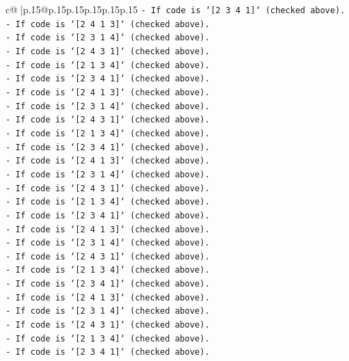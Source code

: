 \documentclass{article}
\begin{document}
{\begin{supertabular}{c@{$\;$}|p{.15\linewidth}@{}p{.15\linewidth}p{.15\linewidth}p{.15\linewidth}p{.15\linewidth}p{.15\linewidth}}
{{{\texttt{{-} If code is `{[}2 3 4 1{]}` (checked above).} \\
\texttt{{-} If code is `{[}2 4 1 3{]}` (checked above).} \\
\texttt{{-} If code is `{[}2 3 1 4{]}` (checked above).} \\
\texttt{{-} If code is `{[}2 4 3 1{]}` (checked above).} \\
\texttt{{-} If code is `{[}2 1 3 4{]}` (checked above).} \\
\texttt{{-} If code is `{[}2 3 4 1{]}` (checked above).} \\
\texttt{{-} If code is `{[}2 4 1 3{]}` (checked above).} \\
\texttt{{-} If code is `{[}2 3 1 4{]}` (checked above).} \\
\texttt{{-} If code is `{[}2 4 3 1{]}` (checked above).} \\
\texttt{{-} If code is `{[}2 1 3 4{]}` (checked above).} \\
\texttt{{-} If code is `{[}2 3 4 1{]}` (checked above).} \\
\texttt{{-} If code is `{[}2 4 1 3{]}` (checked above).} \\
\texttt{{-} If code is `{[}2 3 1 4{]}` (checked above).} \\
\texttt{{-} If code is `{[}2 4 3 1{]}` (checked above).} \\
\texttt{{-} If code is `{[}2 1 3 4{]}` (checked above).} \\
\texttt{{-} If code is `{[}2 3 4 1{]}` (checked above).} \\
\texttt{{-} If code is `{[}2 4 1 3{]}` (checked above).} \\
\texttt{{-} If code is `{[}2 3 1 4{]}` (checked above).} \\
\texttt{{-} If code is `{[}2 4 3 1{]}` (checked above).} \\
\texttt{{-} If code is `{[}2 1 3 4{]}` (checked above).} \\
\texttt{{-} If code is `{[}2 3 4 1{]}` (checked above).} \\
\texttt{{-} If code is `{[}2 4 1 3{]}` (checked above).} \\
\texttt{{-} If code is `{[}2 3 1 4{]}` (checked above).} \\
\texttt{{-} If code is `{[}2 4 3 1{]}` (checked above).} \\
\texttt{{-} If code is `{[}2 1 3 4{]}` (checked above).} \\
\texttt{{-} If code is `{[}2 3 4 1{]}` (checked above).} \\
}}}
\end{supertabular}}
\end{document}
